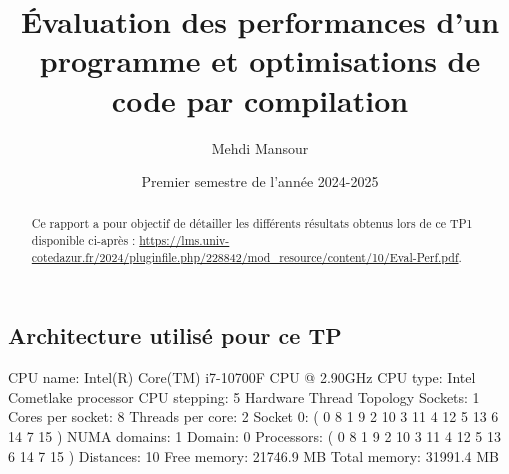 \documentclass{rapport}
\title{Évaluation des performances d’un programme et optimisations de code par compilation}
\author{Mehdi Mansour}
\date{Premier semestre de l'année 2024-2025}
\begin{document}
  \maketitle

  \begin{abstract}
    Ce rapport a pour objectif de détailler les différents résultats obtenus lors de ce TP1 disponible ci-après : \url{https://lms.univ-cotedazur.fr/2024/pluginfile.php/228842/mod_resource/content/10/Eval-Perf.pdf}.
     \end{abstract}
\subsection*{Architecture utilisé pour ce TP}
     \noindent
    CPU name:	Intel(R) Core(TM) i7-10700F CPU @ 2.90GHz
    \newline
    CPU type:	Intel Cometlake processor
    \newline
    CPU stepping:	5
    \newline
    \newline
    \noindent
    Hardware Thread Topology
    \newline
    \newline
    Sockets:		1
    \newline
    Cores per socket:	8
    \newline
    Threads per core:	2
    \newline
    Socket 0:		( 0 8 1 9 2 10 3 11 4 12 5 13 6 14 7 15 )
    \newline
    \newline
    NUMA domains:		1
    \newline
    Domain:			0
    \newline
    Processors:		( 0 8 1 9 2 10 3 11 4 12 5 13 6 14 7 15 )
    \newline
    Distances:		10
    \newline
    Free memory:		21746.9 MB
    \newline
    Total memory:		31991.4 MB
    \newline
\end{document}
